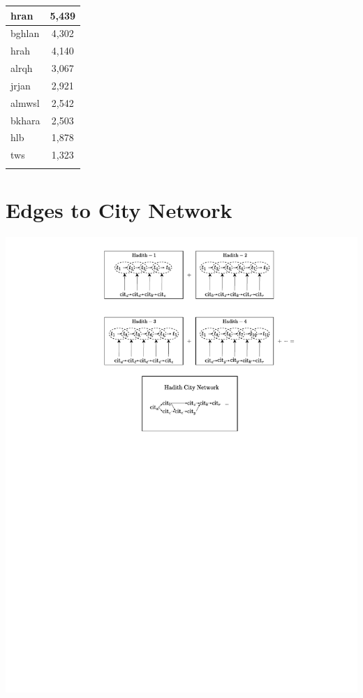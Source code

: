 \documentclass[12pt,english]{article}
\begin{document}
\begin{table}[H]
\begin{tabular}{|l|c|}
\hline
hran & 5,439 \\
\hline
bghlan & 4,302 \\
\hline
hrah & 4,140 \\
\hline
alrqh & 3,067 \\
\hline
jrjan & 2,921 \\
\hline
almwsl & 2,542 \\
\hline
bkhara & 2,503 \\
\hline
hlb & 1,878 \\
\hline
tws & 1,323 \\
\hline
\multicolumn{2}{c}{} \\
\end{tabular}
\end{table}

\newpage
\section{Edges to City Network}
\vspace*{-0.4cm}
\hspace*{-2cm}
\includegraphics[scale=0.9]{edges-to-city-network/b2_edges_to_city_network.pdf}
\end{document}
